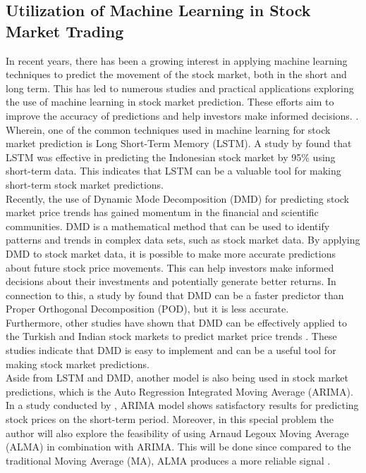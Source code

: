 \subsection{Utilization of Machine Learning in Stock Market Trading}
In recent years, there has been a growing interest in applying machine 
learning techniques to predict the movement of the stock market, 
both in the short and long term. This has led to numerous studies and 
practical applications exploring the use of machine learning in stock market prediction.
 These efforts aim to improve the accuracy of predictions and help investors make 
 informed decisions.
\cite{Kumbure2022, Strader2020, Soni2022, Rea2020, Guo2022}.
 Wherein, one of the common techniques used in machine learning for 
 stock market prediction is Long Short-Term Memory (LSTM). 
 A study by  found that LSTM was effective in predicting the 
 Indonesian stock market by 95\% using short-term data. 
 This indicates that LSTM can be a valuable tool for making short-term stock 
 market predictions.
 \hfill \\

Recently, the use of Dynamic Mode Decomposition (DMD) 
for predicting stock market price trends has gained momentum in the financial 
and scientific communities. DMD is a mathematical method that can be used 
to identify patterns and trends in complex data sets, such as stock market data.
By applying DMD to stock market data, it is possible to make more accurate 
predictions about future stock price movements. This can help investors make
informed decisions about their investments and potentially generate better returns.
In connection to this, a study by  found that DMD can be a 
faster predictor than Proper Orthogonal Decomposition (POD), but 
it is less accurate.
\hfill \\

Furthermore, other studies have shown that DMD can be effectively 
applied to the Turkish and Indian stock markets to predict market price trends
\cite{Savas2017, Kuttichira2017}.
These studies indicate that DMD is easy to implement and can be a useful 
tool for making stock market predictions.
\hfill \\

Aside from LSTM and DMD, another model is also being used in stock market predictions, 
which is the Auto Regression Integrated Moving Average (ARIMA). 
In a study conducted by , 
ARIMA model shows satisfactory results for predicting stock prices on the short-term period. 
Moreover, in this special problem the author will also explore the feasibility of using 
Arnaud Legoux Moving Average (ALMA) in combination with ARIMA. This will be done since 
compared to the traditional Moving Average (MA), 
ALMA produces a more reliable signal 
\cite{Sarkar2019}.